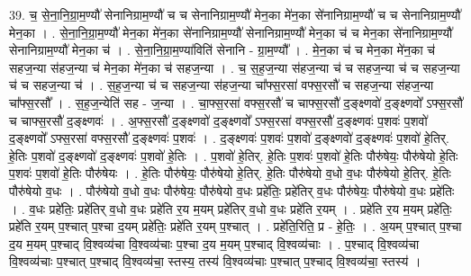 \documentclass[17pt]{extarticle}
\begin{document}
39. च॒ से॒ना॒नि॒ग्रा॒म॒ण्यौ॑ सेनानिग्राम॒ण्यौ॑ च च सेनानिग्राम॒ण्यौ॑ मेन॒का मे॑न॒का से॑नानिग्राम॒ण्यौ॑ च च सेनानिग्राम॒ण्यौ॑ मेन॒का । . से॒ना॒नि॒ग्रा॒म॒ण्यौ॑ मेन॒का मे॑न॒का से॑नानिग्राम॒ण्यौ॑ सेनानिग्राम॒ण्यौ॑ मेन॒का च॑ च मेन॒का से॑नानिग्राम॒ण्यौ॑ सेनानिग्राम॒ण्यौ॑ मेन॒का च॑ । . से॒ना॒नि॒ग्रा॒म॒ण्या॑विति॑ सेनानि - ग्रा॒म॒ण्यौ᳚ । . मे॒न॒का च॑ च मेन॒का मे॑न॒का च॑ सहज॒न्या स॑हज॒न्या च॑ मेन॒का मे॑न॒का च॑ सहज॒न्या । . च॒ स॒ह॒ज॒न्या स॑हज॒न्या च॑ च सहज॒न्या च॑ च सहज॒न्या च॑ च सहज॒न्या च॑ । . स॒ह॒ज॒न्या च॑ च सहज॒न्या स॑हज॒न्या चा᳚फ्स॒रसा॑ वफ्स॒रसौ॑ च सहज॒न्या स॑हज॒न्या चा᳚फ्स॒रसौ᳚ । . स॒ह॒ज॒न्येति॑ सह - ज॒न्या । . चा॒फ्स॒रसा॑ वफ्स॒रसौ॑ च चाफ्स॒रसौ॑ द॒ङ्क्ष्णवो॑ द॒ङ्क्ष्णवो᳚ ऽफ्स॒रसौ॑ च चाफ्स॒रसौ॑ द॒ङ्क्ष्णवः॑ । . अ॒फ्स॒रसौ॑ द॒ङ्क्ष्णवो॑ द॒ङ्क्ष्णवो᳚ ऽफ्स॒रसा॑ वफ्स॒रसौ॑ द॒ङ्क्ष्णवः॑ प॒शवः॑ प॒शवो॑ द॒ङ्क्ष्णवो᳚ ऽफ्स॒रसा॑ वफ्स॒रसौ॑ द॒ङ्क्ष्णवः॑ प॒शवः॑ । . द॒ङ्क्ष्णवः॑ प॒शवः॑ प॒शवो॑ द॒ङ्क्ष्णवो॑ द॒ङ्क्ष्णवः॑ प॒शवो॑ हे॒तिर्. हे॒तिः प॒शवो॑ द॒ङ्क्ष्णवो॑ द॒ङ्क्ष्णवः॑ प॒शवो॑ हे॒तिः । . प॒शवो॑ हे॒तिर्. हे॒तिः प॒शवः॑ प॒शवो॑ हे॒तिः पौरु॑षेयः॒ पौरु॑षेयो हे॒तिः प॒शवः॑ प॒शवो॑ हे॒तिः पौरु॑षेयः । . हे॒तिः पौरु॑षेयः॒ पौरु॑षेयो हे॒तिर्. हे॒तिः पौरु॑षेयो व॒धो व॒धः पौरु॑षेयो हे॒तिर्. हे॒तिः पौरु॑षेयो व॒धः । . पौरु॑षेयो व॒धो व॒धः पौरु॑षेयः॒ पौरु॑षेयो व॒धः प्रहे॑तिः॒ प्रहे॑तिर् व॒धः पौरु॑षेयः॒ पौरु॑षेयो व॒धः प्रहे॑तिः । . व॒धः प्रहे॑तिः॒ प्रहे॑तिर् व॒धो व॒धः प्रहे॑ति र॒य म॒यम् प्रहे॑तिर् व॒धो व॒धः प्रहे॑ति र॒यम् । . प्रहे॑ति र॒य म॒यम् प्रहे॑तिः॒ प्रहे॑ति र॒यम् प॒श्चात् प॒श्चा द॒यम् प्रहे॑तिः॒ प्रहे॑ति र॒यम् प॒श्चात् । . प्रहे॑ति॒रिति॒ प्र - हे॒तिः॒ । . अ॒यम् प॒श्चात् प॒श्चा द॒य म॒यम् प॒श्चाद् वि॒श्वव्य॑चा वि॒श्वव्य॑चाः प॒श्चा द॒य म॒यम् प॒श्चाद् वि॒श्वव्य॑चाः । . प॒श्चाद् वि॒श्वव्य॑चा वि॒श्वव्य॑चाः प॒श्चात् प॒श्चाद् वि॒श्वव्य॑चा॒ स्तस्य॒ तस्य॑ वि॒श्वव्य॑चाः प॒श्चात् प॒श्चाद् वि॒श्वव्य॑चा॒ स्तस्य॑ । \newline
\end{document}
